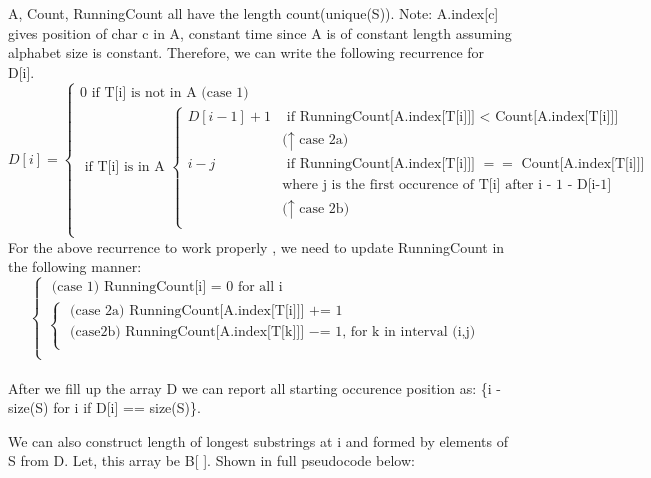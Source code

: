 \documentclass[a4paper,11pt]{article}
\begin{document}
A, Count, RunningCount all have the length count(unique(S)).
Note: A.index[c] gives position of char c in A, constant time since A is of constant length assuming alphabet size is constant. 
Therefore, we can write the following recurrence for D[i].
\[D[i] = \begin{cases}
          0 \text{ if T[i] is not in A (case 1)} \\
          \text{ if T[i] is in A }\begin{cases}
          D[i-1] + 1 &\text{ if RunningCount[A.index[T[i]]] $<$ Count[A.index[T[i]]]} \\&\text{($\uparrow$ case 2a)} \\
          i - j &\text{ if RunningCount[A.index[T[i]]] $==$ Count[A.index[T[i]]] }\\
          &\text{where j is the first occurence of T[i] after i - 1 - D[i-1] }\\&\text{($\uparrow$ case 2b)} \\
          \end{cases} \\ 
         \end{cases}
         \]
For the above recurrence to work properly , we need to update RunningCount in the following manner:
\[\begin{cases}
            \text{ (case 1) RunningCount[i] = 0 for all i  } \\
          \begin{cases}
           \text{ (case 2a) RunningCount[A.index[T[i]]] += 1} \\
          \text{ (case2b)  RunningCount[A.index[T[k]]] $-$= 1, for k in interval (i,j) }\\
          
          \end{cases} \\ 
         \end{cases}
         \] \\
         
After we fill up the array D we can report all starting occurence position as: \{i - size(S) for  i if D[i] == size(S)\}.

We can also construct length of longest substrings  at i and formed by elements of S from D. Let, this array be B[ ]. Shown in full pseudocode below:
\end{document}
